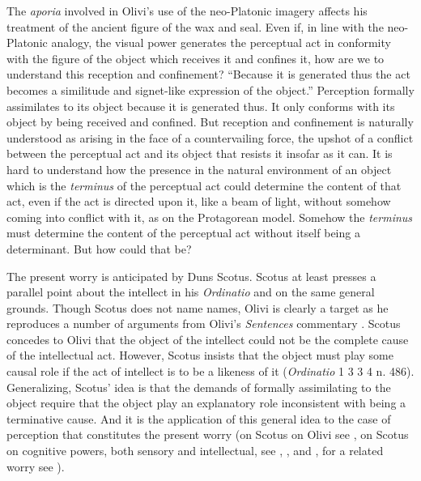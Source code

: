 The \emph{aporia} involved in Olivi's use of the neo-Platonic imagery affects his treatment of the ancient figure of the wax and seal. Even if, in line with the neo-Platonic analogy, the visual power generates the perceptual act in conformity with the figure of the object which receives it and confines it, how are we to understand this reception and confinement? ``Because it is generated thus the act becomes a similitude and signet-like expression of the object.'' Perception formally assimilates to its object because it is generated thus. It only conforms with its object by being received and confined. But reception and confinement is naturally understood as arising in the face of a countervailing force, the upshot of a conflict between the perceptual act and its object that resists it insofar as it can. It is hard to understand how the presence in the natural environment of an object which is the \emph{terminus} of the perceptual act could determine the content of that act, even if the act is directed upon it, like a beam of light, without somehow coming into conflict with it, as on the Protagorean model. Somehow the \emph{terminus} must determine the content of the perceptual act without itself being a determinant. But how could that be?

The present worry is anticipated by Duns Scotus. Scotus at least presses a parallel point about the intellect in his \emph{Ordinatio} and on the same general grounds. Though Scotus does not name names, Olivi is clearly a target as he reproduces a number of arguments from Olivi's \emph{Sentences} commentary \citep[148]{Pasnau:1997aa}. Scotus concedes to Olivi that the object of the intellect could not be the complete cause of the intellectual act. However, Scotus insists that the object must play some causal role if the act of intellect is to be a likeness of it (\emph{Ordinatio} 1 3 3 4 n. 486). Generalizing, Scotus' idea is that the demands of formally assimilating to the object require that the object play an explanatory role inconsistent with being a terminative cause. And it is the application of this general idea to the case of perception that constitutes the present worry (on Scotus on Olivi see \citealt[chapter 4.4]{Pasnau:1997aa}, on Scotus on cognitive powers, both sensory and intellectual, see \citealt[chapter 3]{Tachau:1988aa}, \citealt[257--266]{Spruit:1994qq}, and \citealt{Cross:2014aa}, for a related worry see \citealt[174--175]{Pasnau:1997aa}).

